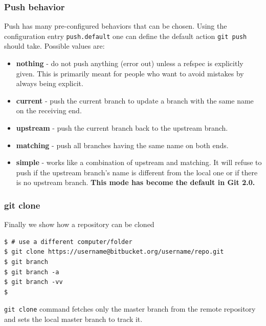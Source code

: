 \documentclass{beamer}
\begin{document}
\begin{frame}
\frametitle{Push behavior}

Push has many pre-configured behaviors that can be chosen.
Using the configuration entry \texttt{push.default}
one can define the default action \texttt{git push} should
take. Possible values are:

\begin{itemize}
\item \textbf{nothing} - do not push anything (error out) unless a refspec is
  explicitly given. This is primarily meant for people who want to
  avoid mistakes by always being explicit. 

\item \textbf{current} - push the current branch to update a branch with the
  same name on the receiving end.

\item \textbf{upstream} - push the current branch back to the upstream
  branch. 

\item \textbf{matching} - push all branches having the same name on both
  ends. 

\item \textbf{simple} - works like a combination of upstream and
  matching. It will refuse to push if the upstream branch's name is
  different from the local one or if there is no upstream branch.
  \textbf{This mode has become the default in Git 2.0.}


\end{itemize}

\end{frame}




\begin{frame}[fragile]
\frametitle{git clone}

Finally we show how a repository can be cloned

\begin{lstlisting}
$ # use a different computer/folder
$ git clone https://username@bitbucket.org/username/repo.git
$ git branch
$ git branch -a
$ git branch -vv
$ 
\end{lstlisting}

\texttt{git clone} command fetches only the master branch from the remote
repository and sets the local master branch to track it.

\end{frame}
\end{document}
